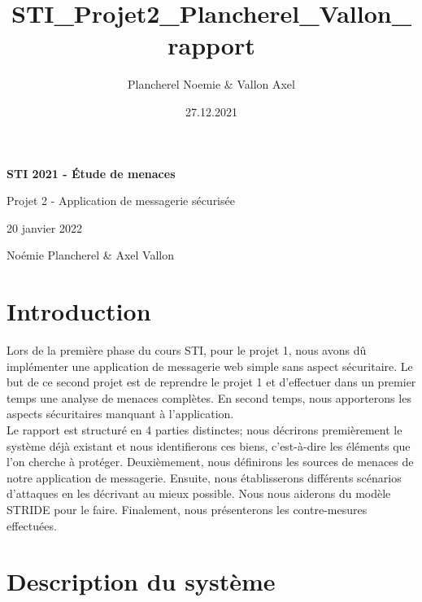 \documentclass[a4paper,10pt]{article}
\title{STI_Projet2_Plancherel_Vallon_rapport}
\author{Plancherel Noemie & Vallon Axel}
\date{27.12.2021}
\begin{document}
\renewcommand{\labelitemi}{\textcolor{black}{\textbullet}}

    \begin{titlepage}
    \begin{center}
        \vspace*{6cm}

        \textbf{\Large STI 2021 - Étude de menaces}

        \vspace{0.5cm}
            \Large Projet 2 - Application de messagerie sécurisée
                
        \vspace{0.5cm}
            \normalsize 20 janvier 2022
                
        \vspace{8cm}
        
        \Large Noémie Plancherel \& Axel Vallon
                
    \end{center}
    \end{titlepage}
    
    \tableofcontents
    \newpage
    
    \section*{Introduction}
    Lors de la première phase du cours STI, pour le projet 1, nous avons dû implémenter une application de messagerie web simple sans aspect sécuritaire. Le but de ce second projet est de reprendre le projet 1 et d'effectuer dans un premier temps une analyse de menaces complètes. En second temps, nous apporterons les aspects sécuritaires manquant à l'application.\\

    Le rapport est structuré en 4 parties distinctes; nous décrirons premièrement le système déjà existant et nous identifierons ces biens, c'est-à-dire les éléments que l'on cherche à protéger. Deuxièmement, nous définirons les sources de menaces de notre application de messagerie. Ensuite, nous établisserons différents scénarios d'attaques en les décrivant au mieux possible. Nous nous aiderons du modèle STRIDE pour le faire. Finalement, nous présenterons les contre-mesures effectuées. 
    \section*{Description du système}
\end{document}
